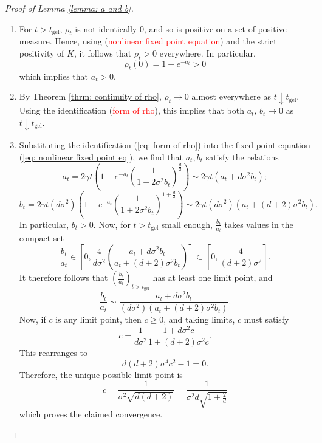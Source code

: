 \begin{proof}[Proof of Lemma \ref{lemma: a and b}] \begin{enumerate}[label=\roman{*}).]
    \item For $t>t_\text{gel}$, $\rho_t$ is not identically $0$, and so is positive on a set of positive measure. Hence, using (\textcolor{red}{nonlinear fixed point equation}) and the strict positivity of $K$, it follows that $\rho_t>0$ everywhere. In particular, \begin{equation}
        \rho_t(0)=1-e^{-a_t}>0
    \end{equation} which implies that $a_t>0.$
    \item By Theorem \ref{thrm: continuity of rho},  $\rho_t\rightarrow 0$ almost everywhere as $t\downarrow t_\text{gel}$. Using the identification (\textcolor{red}{form of rho}), this implies that both $a_t$, $b_t \rightarrow 0$ as $t\downarrow t_\text{gel}$.
    \item Substituting the identification (\ref{eq: form of rho}) into the fixed point equation (\ref{eq: nonlinear fixed point eq}), we find that $a_t, b_t$ satisfy the relations \begin{equation}
        a_t=2\gamma t\left(1-e^{-a_t}\left(\frac{1}{1+2\sigma^2 b_t}\right)^\frac{d}{2}\right)\sim 2\gamma t(a_t+d\sigma^2 b_t);
    \end{equation}\begin{equation}
        b_t=2\gamma t(d\sigma^2)\left(1-e^{-a_t}\left(\frac{1}{1+2\sigma^2 b_t}\right)^{1+\frac{d}{2}}\right) \sim 2\gamma t(d\sigma^2)(a_t+(d+2)\sigma^2 b_t).
    \end{equation} In particular, $b_t>0$. Now, for $t>t_\text{gel}$ small enough, $\frac{b_t}{a_t}$ takes values in the compact set \begin{equation}
        \frac{b_t}{a_t} \in \left[0, \frac{4}{d\sigma^2}\left(\frac{a_t+d\sigma^2b_t}{a_t+(d+2)\sigma^2b_t}\right)\right] \subset \left[0, \frac{4}{(d+2)\sigma^2}\right].
    \end{equation} It therefore follows that $(\frac{b_t}{a_t})_{t>t_\text{gel}}$ has at least one limit point, and \begin{equation}
        \frac{b_t}{a_t}\sim \frac{a_t+d\sigma^2 b_t}{(d\sigma^2)(a_t+(d+2)\sigma^2 b_t)}.
    \end{equation} Now, if $c$ is any limit point, then $c\geq 0$, and taking limits, $c$ must satisfy \begin{equation}
        c=\frac{1}{d\sigma^2} \frac{1+d\sigma^2 c}{1+(d+2)\sigma^2c}.
    \end{equation} This rearranges to \begin{equation}
        d(d+2)\sigma^4c^2-1=0.
    \end{equation} Therefore, the unique possible limit point is\begin{equation}
        c=\frac{1}{\sigma^2 \sqrt{d(d+2)}}=\frac{1}{\sigma^2 d\sqrt{1+\frac{2}{d}}}
    \end{equation} which proves the claimed convergence.
\end{enumerate}\end{proof}
 